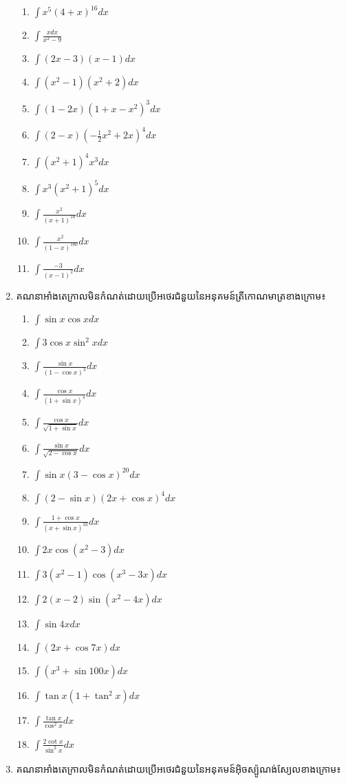 \documentclass[12pt, a4paper]{article}
\begin{document}
\begin{enumerate}[m]
\begin{enumerate}[k, 3]
		\item $\int x^5(4+x)^{16} dx$
		\item $\int \frac{xdx}{x^2-9}$
		\item $\int (2x-3)(x-1) dx$
		\item $\int (x^2-1)(x^2+2) dx$
		\item $\int (1-2x)(1+x-x^2)^3 dx$
		\item $\int (2-x)(-\frac{1}{2}x^2+2x)^4 dx$
		\item $\int (x^2+1)^4x^3 dx$
		\item $\int x^3(x^2+1)^5 dx$
		\item $\int \frac{x^2}{(x+1)^10} dx$
		\item $\int \frac{x^2}{(1-x)^{100}} dx$
		\item $\int \frac{-3}{(x-1)^2} dx$
	\end{enumerate}
	\item គណនាអាំងតេក្រាលមិនកំណត់ដោយប្រើអថេរជំនួយនៃអនុគមន៍ត្រីកោណមាត្រខាងក្រោម៖
	\begin{enumerate}[k, 3]
		\item $\int \sin x \cos x dx$
		\item $\int 3\cos x \sin^2x dx$
		\item $\int \frac{\sin x}{(1-\cos x)^3} dx$
		\item $\int \frac{\cos x}{(1+\sin x)^4} dx$
		\item $\int \frac{\cos x}{\sqrt{1+\sin x}} dx$
		\item $\int \frac{\sin x}{\sqrt{2-\cos x}} dx$
		\item $\int \sin x(3-\cos x)^{20} dx$
		\item $\int (2-\sin x)(2x+\cos x)^4 dx$
		\item $\int \frac{1+\cos x}{(x+\sin x)^{33}} dx$
		\item $\int 2x\cos(x^2-3) dx$
		\item $\int 3(x^2-1)\cos(x^3-3x) dx$
		\item $\int 2(x-2)\sin(x^2-4x) dx$
		\item $\int \sin4x dx$
		\item $\int (2x+\cos7x) dx$
		\item $\int (x^3+\sin100x) dx$
		\item $\int \tan x(1+\tan^2x) dx$
		\item $\int \frac{\tan x}{\cos^2x} dx$
		\item $\int \frac{2\cot x}{\sin^2x} dx$
	\end{enumerate}	
	\item គណនាអាំងតេក្រាលមិនកំណត់ដោយប្រើអថេរជំនួយនៃអនុគមន៍អ៊ិចស្ប៉ូណង់ស្យែលខាងក្រោម៖

\end{enumerate}
\end{document}
